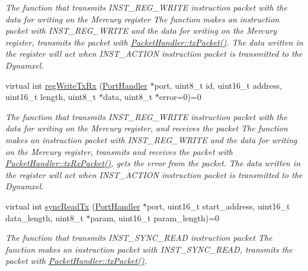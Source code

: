 \begin{DoxyCompactItemize}
\begin{DoxyCompactList}\small\item\em The function that transmits I\+N\+S\+T\+\_\+\+R\+E\+G\+\_\+\+W\+R\+I\+TE instruction packet with the data for writing on the Mercury register  The function makes an instruction packet with I\+N\+S\+T\+\_\+\+R\+E\+G\+\_\+\+W\+R\+I\+TE and the data for writing on the Mercury register,  transmits the packet with \hyperlink{classmercury_1_1_packet_handler_acc3f84f0d952dc2d827d8500de512abe}{Packet\+Handler\+::tx\+Packet()}.  The data written in the register will act when I\+N\+S\+T\+\_\+\+A\+C\+T\+I\+ON instruction packet is transmitted to the Dynamxel. \end{DoxyCompactList}\item 
virtual int \hyperlink{classmercury_1_1_packet_handler_a9944f0271cdcc637429b678a3cd73273}{reg\+Write\+Tx\+Rx} (\hyperlink{classmercury_1_1_port_handler}{Port\+Handler} $\ast$port, uint8\+\_\+t id, uint16\+\_\+t address, uint16\+\_\+t length, uint8\+\_\+t $\ast$data, uint8\+\_\+t $\ast$error=0)=0
\begin{DoxyCompactList}\small\item\em The function that transmits I\+N\+S\+T\+\_\+\+R\+E\+G\+\_\+\+W\+R\+I\+TE instruction packet with the data for writing on the Mercury register, and receives the packet  The function makes an instruction packet with I\+N\+S\+T\+\_\+\+R\+E\+G\+\_\+\+W\+R\+I\+TE and the data for writing on the Mercury register,  transmits and receives the packet with \hyperlink{classmercury_1_1_packet_handler_ac7ceeaec210827d119199144badaad3a}{Packet\+Handler\+::tx\+Rx\+Packet()},  gets the error from the packet.  The data written in the register will act when I\+N\+S\+T\+\_\+\+A\+C\+T\+I\+ON instruction packet is transmitted to the Dynamxel. \end{DoxyCompactList}\item 
virtual int \hyperlink{classmercury_1_1_packet_handler_af51ee95bfc3f386235e746b1418d5d38}{sync\+Read\+Tx} (\hyperlink{classmercury_1_1_port_handler}{Port\+Handler} $\ast$port, uint16\+\_\+t start\+\_\+address, uint16\+\_\+t data\+\_\+length, uint8\+\_\+t $\ast$param, uint16\+\_\+t param\+\_\+length)=0
\begin{DoxyCompactList}\small\item\em The function that transmits I\+N\+S\+T\+\_\+\+S\+Y\+N\+C\+\_\+\+R\+E\+AD instruction packet  The function makes an instruction packet with I\+N\+S\+T\+\_\+\+S\+Y\+N\+C\+\_\+\+R\+E\+AD,  transmits the packet with \hyperlink{classmercury_1_1_packet_handler_acc3f84f0d952dc2d827d8500de512abe}{Packet\+Handler\+::tx\+Packet()}. \end{DoxyCompactList}\item 

\end{DoxyCompactItemize}
